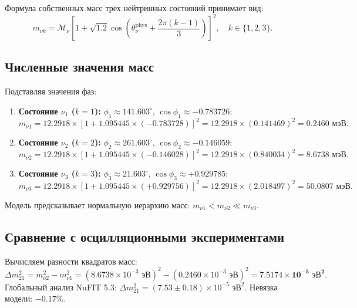 \documentclass[11pt,a4paper]{article}
\theoremstyle{definition}
\theoremstyle{remark}
\begin{document}
Формула собственных масс трех нейтринных состояний принимает вид:
\begin{equation}
    m_{\nu k} = \mathcal{M}_\nu \left[ 1 + \sqrt{1.2} \cos\left( \theta_\nu^{\mathrm{phys}} + \frac{2\pi(k-1)}{3} \right) \right]^2, \quad k \in \{1, 2, 3\}.
\end{equation}

\subsection{Численные значения масс}
Подставляя значения фаз:
\begin{enumerate}
    \item \textbf{Состояние $\nu_1$ ($k=1$):} $\phi_1 \approx 141.603^\circ$, $\cos\phi_1 \approx -0.783726$:
    \begin{equation}
        m_{\nu 1} = 12.2918 \times [1 + 1.095445 \times (-0.783728)]^2 = 12.2918 \times (0.141469)^2 = \mathbf{0.2460\text{ мэВ}}.
    \end{equation}
    \item \textbf{Состояние $\nu_2$ ($k=2$):} $\phi_2 \approx 261.603^\circ$, $\cos\phi_2 \approx -0.146059$:
    \begin{equation}
        m_{\nu 2} = 12.2918 \times [1 + 1.095445 \times (-0.146028)]^2 = 12.2918 \times (0.840034)^2 = \mathbf{8.6738\text{ мэВ}}.
    \end{equation}
    \item \textbf{Состояние $\nu_3$ ($k=3$):} $\phi_3 \approx 21.603^\circ$, $\cos\phi_3 \approx +0.929785$:
    \begin{equation}
        m_{\nu 3} = 12.2918 \times [1 + 1.095445 \times (+0.929756)]^2 = 12.2918 \times (2.018497)^2 = \mathbf{50.0807\text{ мэВ}}.
    \end{equation}
\end{enumerate}

Модель предсказывает нормальную иерархию масс: $m_{\nu 1} < m_{\nu 2} \ll m_{\nu 3}$.

\subsection{Сравнение с осцилляционными экспериментами}
Вычисляем разности квадратов масс:
\begin{equation}
    \Delta m_{21}^2 = m_{\nu 2}^2 - m_{\nu 1}^2 = (8.6738 \times 10^{-3}\text{ эВ})^2 - (0.2460 \times 10^{-3}\text{ эВ})^2 = \mathbf{7.5174 \times 10^{-5}\text{ эВ}^2}.
\end{equation}
Глобальный анализ NuFIT 5.3: $\Delta m_{21}^2 = (7.53 \pm 0.18) \times 10^{-5}\text{ эВ}^2$. Невязка модели: $-0.17\%$.
\end{document}
